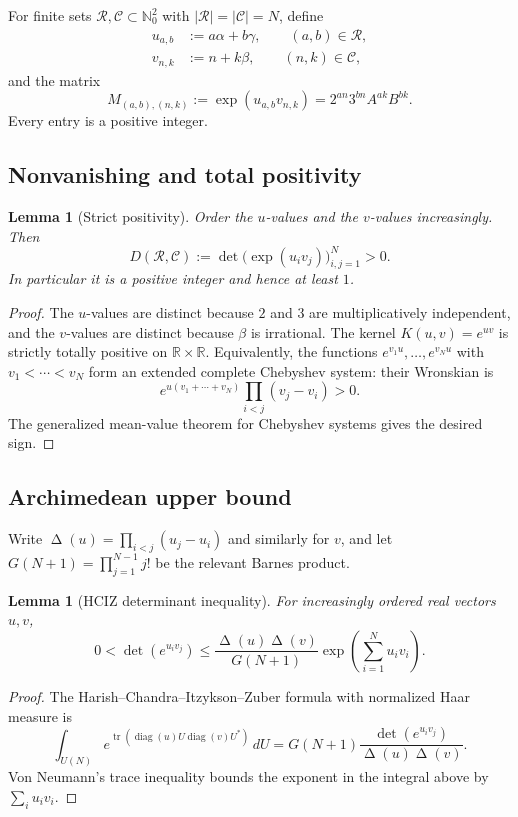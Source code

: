 \documentclass[11pt,oneside]{article}
\newtheorem{lemma}[theorem]{Lemma}
\theoremstyle{definition}
\theoremstyle{remark}
\newcommand{\Nzero}{\mathbb N_0}
\newcommand{\R}{\mathbb R}
\newcommand{\DeltaV}{\mathop{\Delta}\nolimits}
\begin{document}
For finite sets $\mathcal R,\mathcal C\subset\Nzero^2$ with
$|\mathcal R|=|\mathcal C|=N$, define
\begin{align*}
 u_{a,b}&:=a\alpha+b\gamma,\qquad (a,b)\in\mathcal R,\\
 v_{n,k}&:=n+k\beta,\qquad (n,k)\in\mathcal C,
\end{align*}
and the matrix
\begin{equation}\label{eq:grid-matrix}
 M_{(a,b),(n,k)}
 :=\exp(u_{a,b}v_{n,k})
 =2^{an}3^{bn}A^{ak}B^{bk}.
\end{equation}
Every entry is a positive integer.

\subsection{Nonvanishing and total positivity}

\begin{lemma}[Strict positivity]\label{lem:tp}
Order the $u$-values and the $v$-values increasingly.  Then
\[
 D(\mathcal R,\mathcal C):=\det\bigl(\exp(u_i v_j)\bigr)_{i,j=1}^N>0.
\]
In particular it is a positive integer and hence at least $1$.
\end{lemma}
\begin{proof}
The $u$-values are distinct because $2$ and $3$ are multiplicatively
independent, and the $v$-values are distinct because $\beta$ is irrational.
The kernel $K(u,v)=e^{uv}$ is strictly totally positive on $\R\times\R$.
Equivalently, the functions $e^{v_1u},\ldots,e^{v_Nu}$ with
$v_1<\cdots<v_N$ form an extended complete Chebyshev system: their Wronskian is
\[
 e^{u(v_1+\cdots+v_N)}\prod_{i<j}(v_j-v_i)>0.
\]
The generalized mean-value theorem for Chebyshev systems gives the desired
sign.
\end{proof}

\subsection{Archimedean upper bound}

Write $\DeltaV(u)=\prod_{i<j}(u_j-u_i)$ and similarly for $v$, and let
$G(N+1)=\prod_{j=1}^{N-1}j!$ be the relevant Barnes product.

\begin{lemma}[HCIZ determinant inequality]\label{lem:HCIZ}
For increasingly ordered real vectors $u,v$,
\begin{equation}\label{eq:HCIZ-bound}
 0<\det(e^{u_i v_j})
 \le
 \frac{\DeltaV(u)\DeltaV(v)}{G(N+1)}
 \exp\!\left(\sum_{i=1}^N u_i v_i\right).
\end{equation}
\end{lemma}
\begin{proof}
The Harish--Chandra--Itzykson--Zuber formula with normalized Haar measure is
\[
 \int_{U(N)}e^{\operatorname{tr}(\operatorname{diag}(u)
 U\operatorname{diag}(v)U^*)}\,dU
 =G(N+1)\frac{\det(e^{u_i v_j})}{\DeltaV(u)\DeltaV(v)}.
\]
Von Neumann's trace inequality bounds the exponent in the integral above by
$\sum_i u_i v_i$.
\end{proof}
\end{document}
